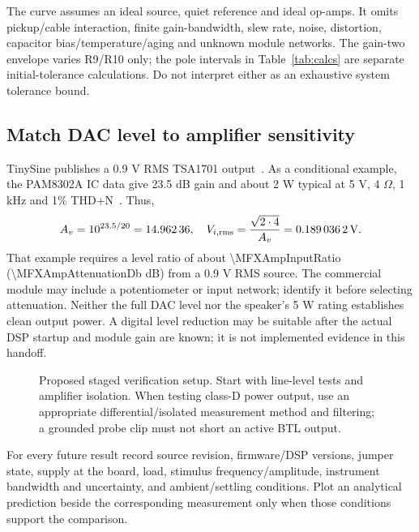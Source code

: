 \documentclass[a4paper,10pt]{article}
\newcommand{\calc}[1]{\num[round-precision=3]{#1}}
\begin{document}
The curve assumes an ideal source, quiet reference and ideal op-amps. It omits pickup/cable interaction, finite gain-bandwidth, slew rate, noise, distortion, capacitor bias/temperature/aging and unknown module networks. The gain-two envelope varies R9/R10 only; the pole intervals in Table~\ref{tab:calcs} are separate initial-tolerance calculations. Do not interpret either as an exhaustive system tolerance bound.

\subsection{Match DAC level to amplifier sensitivity}
TinySine publishes a 0.9 V RMS TSA1701 output~\cite{tsa}. As a conditional example, the PAM8302A IC data give 23.5 dB gain and about 2 W typical at 5 V, 4 $\Omega$, 1 kHz and 1\% THD+N~\cite{pam}. Thus,
\begin{equation}
A_v=10^{23.5/20}=\calc{\MFXAmpGainLinear},\quad
V_{i,\rm rms}=\frac{\sqrt{2\cdot4}}{A_v}=\SI{\MFXAmpInputRms}{\volt}.
\end{equation}
That example requires a level ratio of about \calc{\MFXAmpInputRatio} (\calc{\MFXAmpAttenuationDb} dB) from a 0.9 V RMS source. The commercial module may include a potentiometer or input network; identify it before selecting attenuation. Neither the full DAC level nor the speaker's 5 W rating establishes clean output power. A digital level reduction may be suitable after the actual DSP startup and module gain are known; it is not implemented evidence in this handoff.

\begin{figure}[H]\centering\MFXTestSetupDiagram
\caption{Proposed staged verification setup. Start with line-level tests and amplifier isolation. When testing class-D power output, use an appropriate differential/isolated measurement method and filtering; a grounded probe clip must not short an active BTL output.}\label{fig:test}
\end{figure}

For every future result record source revision, firmware/DSP versions, jumper state, supply at the board, load, stimulus frequency/amplitude, instrument bandwidth and uncertainty, and ambient/settling conditions. Plot an analytical prediction beside the corresponding measurement only when those conditions support the comparison.
\end{document}
